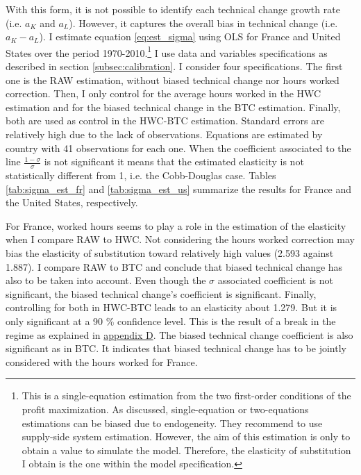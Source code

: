 With this form, it is not possible to identify each technical change growth rate (i.e. $a_K$ and $a_L$). However, it captures the overall bias in technical change (i.e. $a_K - a_L$). I estimate equation \eqref{eq:est_sigma} using OLS for France and United States over the period 1970-2010.\footnote{This is a single-equation estimation from the two first-order conditions of the profit maximization. As \cite{Klump2007} discussed, single-equation or two-equations estimations can be biased due to endogeneity. They recommend to use supply-side system estimation. However, the aim of this estimation is only to obtain a value to simulate the model. Therefore, the elasticity of substitution I obtain is the one within the model specification.} I use data and variables specifications as described in section \ref{subsec:calibration}. I consider four specifications. The first one is the RAW estimation, without biased technical change nor hours worked correction. Then, I only control for the average hours worked in the HWC estimation and for the biased technical change in the BTC estimation. Finally, both are used as control in the HWC-BTC estimation. Standard errors are relatively high due to the lack of observations. Equations are estimated by country with 41 observations for each one. When the coefficient associated to the line $\frac{1-\sigma}{\sigma}$ is not significant it means that the estimated elasticity is not statistically different from 1, i.e. the Cobb-Douglas case. Tables \ref{tab:sigma_est_fr} and \ref{tab:sigma_est_us} summarize the results for France and the United States, respectively.

For France, worked hours seems to play a role in the estimation of the elasticity when I compare RAW to HWC. Not considering the hours worked correction may bias the elasticity of substitution toward relatively high values (2.593 against 1.887). I compare RAW to BTC and conclude that biased technical change has also to be taken into account. Even though the $\sigma$ associated coefficient is not significant, the biased technical change's coefficient is significant. Finally, controlling for both in HWC-BTC leads to an elasticity about 1.279. But it is only significant at a 90 \% confidence level. This is the result of a break in the regime as explained in \hyperref[appendix:regime]{appendix D}. The biased technical change coefficient is also significant as in BTC. It indicates that biased technical change has to be jointly considered with the hours worked for France.

